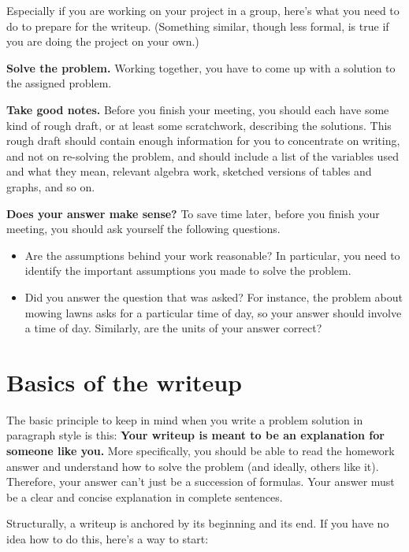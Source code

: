 \documentclass{article}
\begin{document}
Especially if you are working on your project in a group, here's what you need to do to prepare for the writeup. (Something similar, though less formal, is true if you are doing the project on your own.)

\textbf{Solve the problem.} Working together, you have to come up with a solution to the assigned problem.

\textbf{Take good notes.} Before you finish your meeting, you should each have some kind of rough draft, or at least some scratchwork, describing the solutions. This rough draft should contain enough information for you to concentrate on writing, and not on re-solving the problem, and should include a list of the variables used and what they mean, relevant algebra work, sketched versions of tables and graphs, and so on.

\textbf{Does your answer make sense?} To save time later, before you finish your meeting, you should ask yourself the following questions.

\begin{itemize}

\item Are the assumptions behind your work reasonable? In particular, you need to identify the important assumptions you made to solve the problem.

\item Did you answer the question that was asked? For instance, the problem about mowing lawns asks for a particular time of day, so your answer should involve a time of day. Similarly, are the units of your answer correct?

\end{itemize}

\section*{Basics of the writeup}

The basic principle to keep in mind when you write a problem solution in paragraph style is this: \textbf{Your writeup is meant to be an explanation for someone like you.} More specifically, you should be able to read the homework answer and understand how to solve the problem (and ideally, others like it). Therefore, your answer can't just be a succession of formulas. Your answer must be a clear and concise explanation in complete sentences.

Structurally, a writeup is anchored by its beginning and its end. If you have no idea how to do this, here's a way to start:
\end{document}
